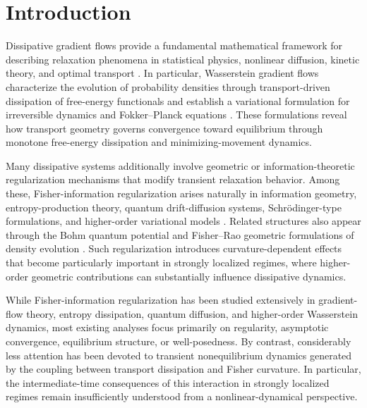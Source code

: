 \documentclass[aps,prl,twocolumn,10pt,superscriptaddress]{revtex4-2}
\begin{document}
\maketitle



\section{Introduction}

Dissipative gradient flows provide a fundamental mathematical framework for describing relaxation phenomena in statistical physics, nonlinear diffusion, kinetic theory, and optimal transport \cite{jordan1998variational,otto2001geometry,ambrosio2008gradient,carrillo2003kinetic,arnold2001convex}. In particular, Wasserstein gradient flows characterize the evolution of probability densities through transport-driven dissipation of free-energy functionals and establish a variational formulation for irreversible dynamics and Fokker--Planck equations \cite{villani2003topics,villani2009optimal}. These formulations reveal how transport geometry governs convergence toward equilibrium through monotone free-energy dissipation and minimizing-movement dynamics.

Many dissipative systems additionally involve geometric or information-theoretic regularization mechanisms that modify transient relaxation behavior. Among these, Fisher-information regularization arises naturally in information geometry, entropy-production theory, quantum drift-diffusion systems, Schrödinger-type formulations, and higher-order variational models \cite{arnold2001convex, amari2000methods,carlen1991superadditivity,gianazza2009wasserstein,dolbeault2006logarithmic,jungel2009transport,matthes2009family}. Related structures also appear through the Bohm quantum potential and Fisher--Rao geometric formulations of density evolution \cite{jungel2009transport,bohm1952suggested,madelung1927quantentheorie,jungel2001quasi}. Such regularization introduces curvature-dependent effects that become particularly important in strongly localized regimes, where higher-order geometric contributions can substantially influence dissipative dynamics.

While Fisher-information regularization has been studied extensively in gradient-flow theory, entropy dissipation, quantum diffusion, and higher-order Wasserstein dynamics, most existing analyses focus primarily on regularity, asymptotic convergence, equilibrium structure, or well-posedness. By contrast, considerably less attention has been devoted to transient nonequilibrium dynamics generated by the coupling between transport dissipation and Fisher curvature. In particular, the intermediate-time consequences of this interaction in strongly localized regimes remain insufficiently understood from a nonlinear-dynamical perspective.
\end{document}
